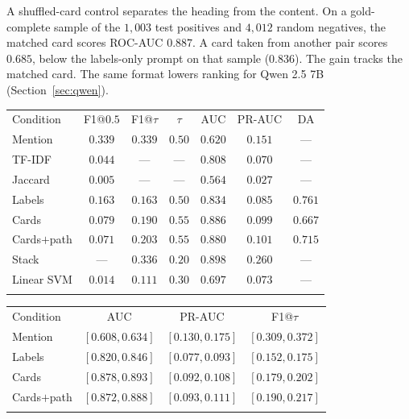 \documentclass{ws-ijait}
\begin{document}
A shuffled-card control separates the heading from the content.
On a gold-complete sample of the $1{,}003$ test positives and
$4{,}012$ random negatives, the matched card scores {ROC}-{AUC}
$0.887$.
A card taken from another pair scores $0.685$, below the
labels-only prompt on that sample ($0.836$).
The gain tracks the matched card.
The same format lowers ranking for {Qwen} 2.5 7B
(Section~\ref{sec:qwen}).

\begin{table}[th]
{\begin{tabular}{@{}lcccccc@{}}
\toprule
Condition & F1@$0.5$ & F1@$\tau$ & $\tau$ & {AUC} & {PR}-{AUC} & {DA} \\
\colrule
Mention & $0.339$ & $0.339$ & $0.50$ & $0.620$ & $0.151$ & --- \\
{TF}-{IDF} & $0.044$ & --- & --- & $0.808$ & $0.070$ & --- \\
Jaccard & $0.005$ & --- & --- & $0.564$ & $0.027$ & --- \\
Labels & $0.163$ & $0.163$ & $0.50$ & $0.834$ & $0.085$ & $\mathbf{0.761}$ \\
Cards & $0.079$ & $0.190$ & $0.55$ & $\mathbf{0.886}$ & $0.099$ & $0.667$ \\
Cards$+$path & $0.071$ & $0.203$ & $0.55$ & $0.880$ & $0.101$ & $0.715$ \\
Stack & --- & $\mathbf{0.336}$ & $0.20$ & $0.898$ & $\mathbf{0.260}$ & --- \\
Linear {SVM} & $0.014$ & $0.111$ & $0.30$ & $0.697$ & $0.073$ & --- \\
\botrule
\end{tabular}}
\label{tab:rank}
\end{table}

\begin{table}[th]
{\begin{tabular}{@{}lccc@{}}
\toprule
Condition & {AUC} & {PR}-{AUC} & F1@$\tau$ \\
\colrule
Mention & $[0.608,0.634]$ & $[0.130,0.175]$ & $[0.309,0.372]$ \\
Labels & $[0.820,0.846]$ & $[0.077,0.093]$ & $[0.152,0.175]$ \\
Cards & $[0.878,0.893]$ & $[0.092,0.108]$ & $[0.179,0.202]$ \\
Cards$+$path & $[0.872,0.888]$ & $[0.093,0.111]$ & $[0.190,0.217]$ \\
\botrule
\end{tabular}}
\label{tab:ci}
\end{table}
\end{document}
